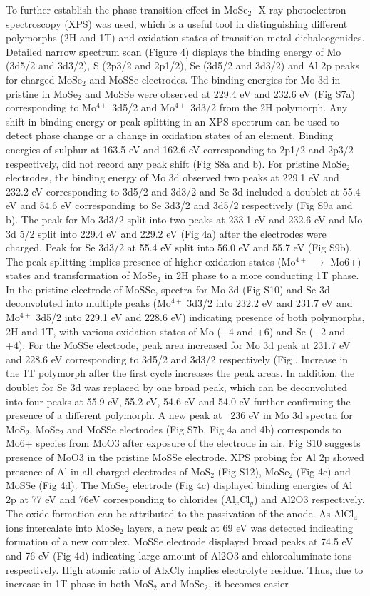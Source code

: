 \documentclass[num-refs]{wiley-article}
\begin{document}
To further establish the phase transition effect in MoSe$_2$- X-ray photoelectron spectroscopy (XPS) was used, which is a useful tool in distinguishing different polymorphs (2H and 1T) and oxidation states of transition metal dichalcogenides. Detailed narrow spectrum scan (Figure 4) displays the binding energy of Mo (3d5/2 and 3d3/2), S (2p3/2 and 2p1/2), Se (3d5/2 and 3d3/2) and Al 2p peaks for charged MoSe$_2$ and MoSSe electrodes. The binding energies for Mo 3d in pristine in MoSe$_2$ and MoSSe were observed at 229.4 eV and 232.6 eV (Fig S7a) corresponding to Mo$^{4+}$ 3d5/2 and Mo$^{4+}$ 3d3/2 from the 2H polymorph. Any shift in binding energy or peak splitting in an XPS spectrum can be used to detect phase change or a change in oxidation states of an element. Binding energies of sulphur at 163.5 eV and 162.6 eV corresponding to 2p1/2 and 2p3/2 respectively, did not record any peak shift (Fig S8a and b). For pristine MoSe$_2$ electrodes, the binding energy of Mo 3d observed two peaks at 229.1 eV and 232.2 eV corresponding to 3d5/2 and 3d3/2 and Se 3d included a doublet at 55.4 eV and 54.6 eV corresponding to Se 3d3/2 and 3d5/2 respectively (Fig S9a and b). The peak for Mo 3d3/2 split into two peaks at 233.1 eV and 232.6 eV and Mo 3d 5/2 split into 229.4 eV and 229.2 eV (Fig 4a) after the electrodes were charged. Peak for Se 3d3/2 at 55.4 eV split into 56.0 eV and 55.7 eV (Fig S9b). The peak splitting implies presence of higher oxidation states (Mo$^{4+}$ $\rightarrow$ Mo6+) states and transformation of MoSe$_2$ in 2H phase to a more conducting 1T phase. In the pristine electrode of MoSSe, spectra for Mo 3d (Fig S10) and Se 3d deconvoluted into multiple peaks (Mo$^{4+}$ 3d3/2 into 232.2 eV and 231.7 eV and Mo$^{4+}$ 3d5/2 into 229.1 eV and 228.6 eV) indicating presence of both polymorphs, 2H and 1T, with various oxidation states of Mo (+4 and +6) and Se (+2 and +4). For the MoSSe electrode, peak area increased for Mo 3d peak at 231.7 eV and 228.6 eV corresponding to 3d5/2 and 3d3/2 respectively (Fig . Increase in the 1T polymorph after the first cycle increases the peak areas. In addition, the doublet for Se 3d was replaced by one broad peak, which can be deconvoluted into four peaks at 55.9 eV, 55.2 eV, 54.6 eV and 54.0 eV further confirming the presence of a different polymorph. A new peak at ~236 eV in Mo 3d spectra for MoS$_2$, MoSe$_2$ and MoSSe electrodes (Fig S7b, Fig 4a and 4b) corresponds to Mo6+ species from MoO3 after exposure of the electrode in air. Fig S10 suggests presence of MoO3 in the pristine MoSSe electrode. XPS probing for Al 2p showed presence of Al in all charged electrodes of MoS$_2$ (Fig S12), MoSe$_2$ (Fig 4c) and MoSSe (Fig 4d). The MoSe$_2$ electrode (Fig 4c) displayed binding energies of Al 2p at 77 eV and 76eV corresponding to chlorides (Al$_x$Cl$_y$) and Al2O3 respectively. The oxide formation can be attributed to the passivation of the anode. As AlCl$_4^-$ ions intercalate into MoSe$_2$ layers, a new peak at 69 eV was detected indicating formation of a new complex. MoSSe electrode displayed broad peaks at 74.5 eV and 76 eV (Fig 4d) indicating large amount of Al2O3 and chloroaluminate ions respectively. High atomic ratio of AlxCly implies electrolyte residue. Thus, due to increase in 1T phase in both MoS$_2$ and MoSe$_2$, it becomes easier 
\end{document}
